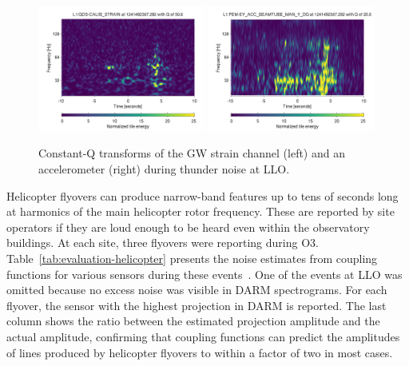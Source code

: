 \begin{figure}
	\includegraphics[width=0.49\textwidth]{figures/noise-studies/evaluation-thunder-strain.png}
	\includegraphics[width=0.49\textwidth]{figures/noise-studies/evaluation-thunder-acc.png}
	\caption{Constant-Q transforms of the GW strain channel (left) and an accelerometer (right) during thunder noise at LLO.}
	\label{fig:evaluation-thunder}
\end{figure}

Helicopter flyovers can produce narrow-band features up to tens of seconds long at harmonics of the main helicopter rotor frequency.
These are reported by site operators if they are loud enough to be heard even within the observatory buildings.
At each site, three flyovers were reporting during O3.
Table~\ref{tab:evaluation-helicopter} presents the noise estimates from coupling functions for various sensors during these events~\citep{alog_helicopter}.
One of the events at LLO was omitted because no excess noise was visible in DARM spectrograms.
For each flyover, the sensor with the highest projection in DARM is reported.
The last column shows the ratio between the estimated projection amplitude and the actual amplitude, confirming that coupling functions can predict the amplitudes of lines produced by helicopter flyovers to within a factor of two in most cases.

